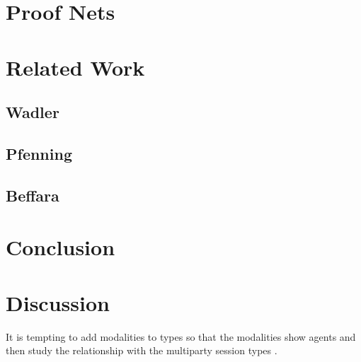 
\section{Proof Nets}


\section{Related Work}

\subsection{Wadler}

\subsection{Pfenning}

\subsection{Beffara}

\section{Conclusion}


\section{Discussion}

It is tempting to add modalities to types so that the
modalities show agents and then study the relationship with the
multiparty session types .

